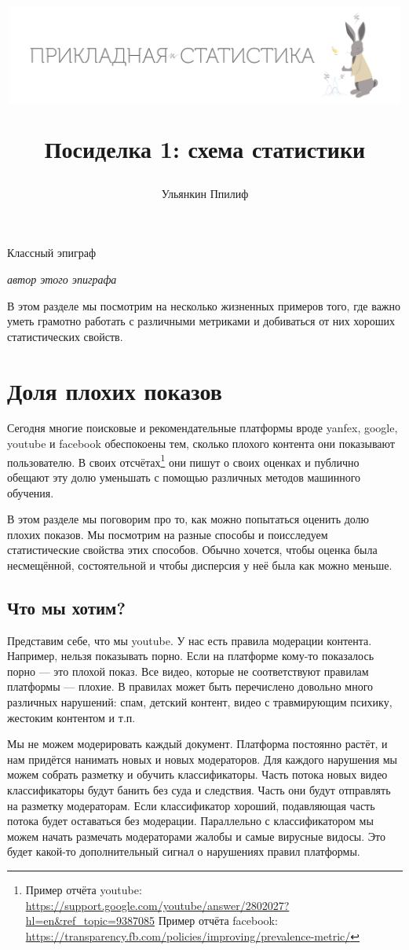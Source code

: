 \documentclass[12pt, a4paper, oneside]{article}
\title{
\begin{center} 
\includegraphics[width=0.99\textwidth]{logo.png}
\end{center}

Посиделка 1: схема статистики}
\date{ } %
\author{Ульянкин Ппилиф}
\begin{document}

\maketitle

\epigraph{Классный эпиграф}{\textit{автор этого эпиграфа}}

В этом разделе мы посмотрим на несколько жизненных примеров того, где важно уметь грамотно работать с различными метриками и добиваться от них хороших статистических свойств. 

\section{Доля плохих показов}

Сегодня многие поисковые и рекомендательные платформы вроде yanfex, google, youtube и facebook обеспокоены тем, сколько плохого контента они показывают пользователю. В своих отсчётах\footnote{Пример отчёта youtube: \url{https://support.google.com/youtube/answer/2802027?hl=en&ref_topic=9387085} \newline  Пример отчёта facebook: \url{https://transparency.fb.com/policies/improving/prevalence-metric/}} они пишут о своих оценках  и публично обещают эту долю уменьшать с помощью различных методов машинного обучения.

В этом разделе мы поговорим про то, как можно попытаться оценить долю плохих показов. Мы посмотрим на разные способы и поисследуем статистические свойства этих способов. Обычно хочется, чтобы оценка была несмещённой, состоятельной и  чтобы дисперсия у неё была как можно меньше. 

\subsection{Что мы хотим?} 

Представим себе, что мы youtube. У нас есть правила модерации контента. Например, нельзя показывать порно. Если на платформе кому-то показалось порно --- это плохой показ. Все видео, которые не соответствуют правилам платформы --- плохие. В правилах может быть перечислено довольно много различных нарушений: спам, детский контент, видео с травмирующим психику, жестоким контентом и т.п.

Мы не можем модерировать каждый документ. Платформа постоянно растёт, и нам придётся нанимать новых и новых модераторов. Для каждого нарушения мы можем собрать разметку и обучить классификаторы. Часть потока новых видео классификаторы будут банить без суда и следствия. Часть они будут отправлять на разметку модераторам. Если классификатор хороший, подавляющая часть потока будет оставаться без модерации. Параллельно с классификатором мы можем начать размечать модераторами жалобы и самые вирусные видосы. Это будет какой-то дополнительный сигнал о нарушениях правил платформы. 
\end{document}
